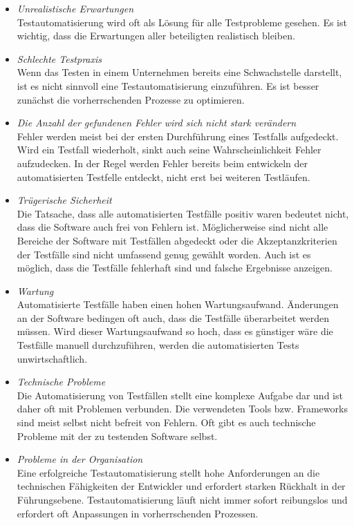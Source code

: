 \begin{itemize}
\item \textit{Unrealistische Erwartungen} \\
Testautomatisierung wird oft als Lösung für alle Testprobleme gesehen. Es ist wichtig, dass die Erwartungen aller beteiligten realistisch bleiben.
\item \textit{Schlechte Testpraxis } \\
Wenn das Testen in einem Unternehmen bereits eine Schwachstelle darstellt, ist es nicht sinnvoll eine Testautomatisierung einzuführen. Es ist besser zunächst die vorherrschenden Prozesse zu optimieren.
\item \textit{Die Anzahl der gefundenen Fehler wird sich nicht stark verändern } \\
Fehler werden meist bei der ersten Durchführung eines Testfalls aufgedeckt. Wird ein Testfall wiederholt, sinkt auch seine Wahrscheinlichkeit Fehler aufzudecken. In der Regel werden Fehler bereits beim entwickeln der automatisierten Testfelle entdeckt, nicht erst bei weiteren Testläufen.
\item \textit{Trügerische Sicherheit} \\
Die Tatsache, dass alle automatisierten Testfälle positiv waren bedeutet nicht, dass die Software auch frei von Fehlern ist. Möglicherweise sind nicht alle Bereiche der Software mit Testfällen abgedeckt oder die Akzeptanzkriterien der Testfälle sind nicht umfassend genug gewählt worden. Auch ist es möglich, dass die Testfälle fehlerhaft sind und falsche Ergebnisse anzeigen.
\item \textit{Wartung} \\
 Automatisierte Testfälle haben einen hohen Wartungsaufwand. Änderungen an der Software bedingen oft auch, dass die Testfälle überarbeitet werden müssen. Wird dieser Wartungsaufwand so hoch, dass es günstiger wäre die Testfälle manuell durchzuführen, werden die automatisierten Tests unwirtschaftlich.
\item \textit{Technische Probleme} \\
Die Automatisierung von Testfällen stellt eine komplexe Aufgabe dar und ist daher oft mit Problemen verbunden. Die verwendeten Tools bzw. Frameworks sind meist selbst nicht befreit von Fehlern. Oft gibt es auch technische Probleme mit der zu testenden Software selbst.
\item \textit{Probleme in der Organisation} \\
Eine erfolgreiche Testautomatisierung stellt hohe Anforderungen an die technischen Fähigkeiten der Entwickler und erfordert starken Rückhalt in der Führungsebene. Testautomatisierung läuft nicht immer sofort reibungslos und erfordert oft Anpassungen in vorherrschenden Prozessen.
\end{itemize}


